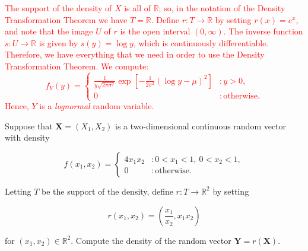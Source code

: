 \documentclass[12pt,reqno]{amsart}
\begin{document}
\bigskip
\textcolor{red}{The support of the density of $X$ is all of $\mathbb{R}$; so, in the notation of the Density Transformation Theorem we have $T = \mathbb{R}$. Define $r:T \to \mathbb{R}$ by setting $r(x) = e^x$, and note that the image $U$ of $r$ is the open interval $(0,\infty)$. The inverse function $s:U \to \mathbb{R}$ is given by $s(y) = \log{y}$, which is continuously differentiable. Therefore, we have everything that we need in order to use the Density Transformation Theorem. We compute:
	\[f_Y(y) = \begin{cases}
	\frac{1}{y\sqrt{2\pi \sigma^2}} \exp \left[ - \frac{1}{2\sigma^2} \left(\log{y} - \mu  \right)^2 \right] & : y>0, \\
	0 & : \text{otherwise}.
	\end{cases}
	\]
Hence, $Y$ is a \textit{lognormal} random variable.}
\bigskip









\prob Suppose that $\mathbf{X}=(X_1,X_2)$ is a two-dimensional continuous random vector with density

	\[
	f(x_1,x_2) = \begin{cases}
	4x_1x_2 & : 0 < x_1 < 1, \ 0 < x_2 < 1, \\
	0 & : \text{otherwise}.
	\end{cases}
	\]

Letting $T$ be the support of the density, define $r:T \to \mathbb{R}^2$ by setting

	\[r(x_1,x_2) = \left( \frac{x_1}{x_2}, x_1x_2 \right)
	\]
	
for $(x_1,x_2)\in \mathbb{R}^2$. Compute the density of the random vector $\mathbf{Y} = r(\mathbf{X})$.
\end{document}
